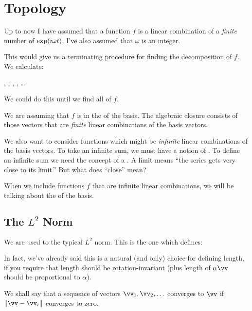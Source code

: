 \section{Topology}

Up to now I have assumed that a function $f$ is a linear combination of
a \emph{finite} number of $\exp\mathopen{}\left( {i\omega t} \right)\mathclose{}$. I've also assumed that
$\omega$ is an integer.

This would give us a terminating procedure for finding the decomposition
of $f$. We calculate:

\begin{nedqn}
  ,
  ,
  ,
  ,
  \ldots
\end{nedqn}

\noindent
We could do this until we find all of $f$.

We are assuming that $f$ is in the  of the
basis. The algebraic closure consists of those vectors that are
\emph{finite} linear combinations of the basis vectors.

We also want to consider functions which might be \emph{infinite} linear
combinations of the basis vectors. To take an infinite sum, we must have
a notion of . To define an infinite sum we need the
concept of a . A limit means ``the series gets very close
to its limit.'' But what does ``close'' mean?

When we include functions $f$ that are infinite linear combinations, we
will be talking about the  of the basis.

\subsection{The $L^2$ Norm}

We are used to the typical $L^2$ norm. This is the one which defines:

\begin{nedqn}
  \norm{\vv}
\eqcol
  \sqrt{\vv \cdot \vv}
\end{nedqn}

\noindent
In fact, we've already said this is a natural (and only) choice for
defining length, if you require that length should be rotation-invariant
(plus length of $\alpha \vv$ should be proportional to $\alpha$).

We shall say that a sequence of vectors $\vv_1, \vv_2, \ldots$ converges
to $\vv$ if $\norm{\vv - \vv_i}$ converges to zero.

